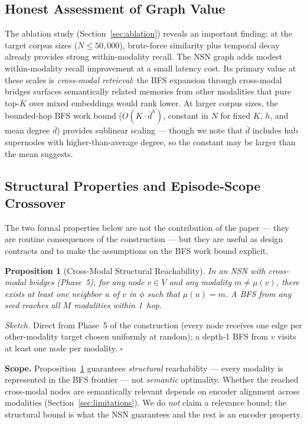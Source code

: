 \documentclass[11pt]{article}
\newtheorem{proposition}[theorem]{Proposition}
\begin{document}
\subsection{Honest Assessment of Graph Value}

The ablation study (Section~\ref{sec:ablation}) reveals an important
finding: at the target corpus sizes ($N \leq 50{,}000$), brute-force
similarity plus temporal decay already provides strong within-modality
recall. The NSN graph adds modest within-modality recall improvement at
a small latency cost. Its primary value at these scales is
\emph{cross-modal retrieval}: the BFS expansion through cross-modal
bridges surfaces semantically related memories from other modalities
that pure top-$K$ over mixed embeddings would rank lower. At larger
corpus sizes, the bounded-hop BFS work bound ($O(K \cdot \bar{d}^h)$,
constant in $N$ for fixed $K$, $h$, and mean degree $\bar{d}$) provides
sublinear scaling --- though we note that $\bar{d}$ includes hub
supernodes with higher-than-average degree, so the constant may be
larger than the mean suggests.

\subsection{Structural Properties and Episode-Scope Crossover}

The two formal properties below are not the contribution of the paper
--- they are routine consequences of the construction --- but they
are useful as design contracts and to make the assumptions on the
BFS work bound explicit.

\begin{proposition}[Cross-Modal Structural Reachability]
\label{thm:crossmodal}
In an NSN with cross-modal bridges (Phase~5), for any node $v \in V$
and any modality $m \neq \mu(v)$, there exists at least one neighbor
$u$ of $v$ in $\phi$ such that $\mu(u) = m$. A BFS from any seed
reaches all $M$ modalities within 1~hop.
\end{proposition}

\noindent\textit{Sketch.} Direct from Phase~5 of the construction
(every node receives one edge per other-modality target chosen
uniformly at random); a depth-1 BFS from $v$ visits at least one
node per modality. \hfill$\square$

\noindent\textbf{Scope.} Proposition~\ref{thm:crossmodal} guarantees
\emph{structural} reachability --- every modality is represented in the
BFS frontier --- not \emph{semantic} optimality. Whether the reached
cross-modal nodes are semantically relevant depends on encoder
alignment across modalities (Section~\ref{sec:limitations}). We do
\emph{not} claim a relevance bound; the structural bound is what the
NSN guarantees and the rest is an encoder property.
\end{document}
